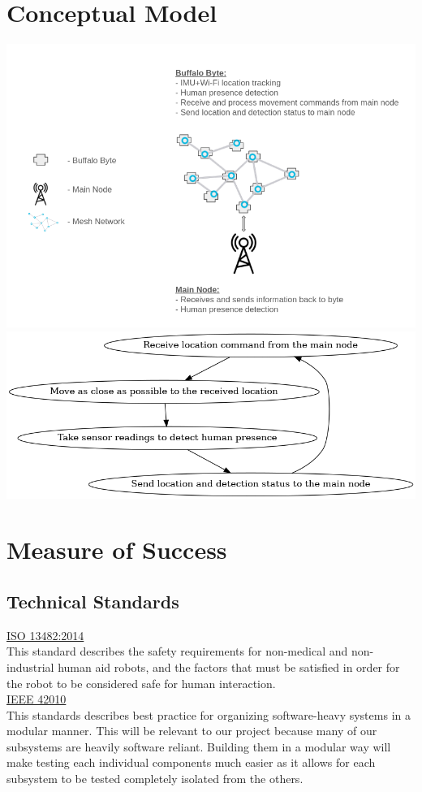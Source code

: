 \documentclass[10pt]{article}
\begin{document}
\section*{Conceptual Model}
\begin{center}
\includegraphics[scale=0.4]{conceptual-model}\\
\includegraphics[scale=0.4]{state}\\
\end{center}

\section*{Measure of Success}
\subsection*{Technical Standards}
\underline{ISO 13482:2014}\\[0.25\baselineskip]
This standard describes the safety requirements for non-medical and non-industrial human aid robots, and the factors that must be satisfied in order for the robot to be considered safe for human interaction.\\[0.1in]
\underline{IEEE 42010}\\[0.25\baselineskip]
This standards describes best practice for organizing software-heavy systems in a modular manner. This will be relevant to our project because many of our subsystems are heavily software reliant. Building them in a modular way will make testing each individual components much easier as it allows for each subsystem to be tested completely isolated from the others.
\end{document}
